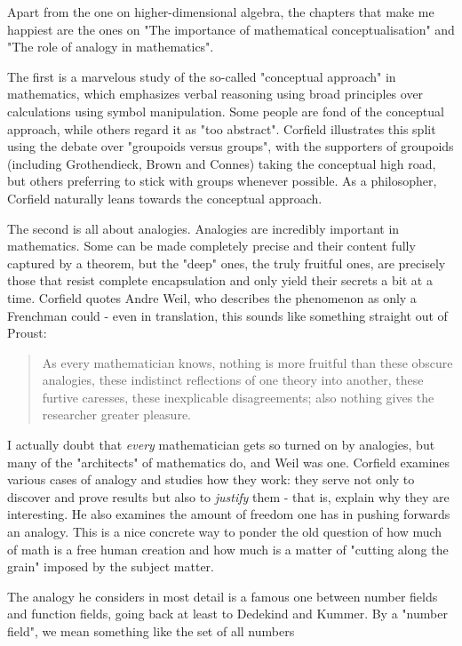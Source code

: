 Apart from the one on higher-dimensional algebra, the chapters
that make me happiest are the ones on "The importance of 
mathematical conceptualisation" and "The role of analogy in
mathematics".   

The first is a marvelous study of the so-called "conceptual 
approach" in mathematics, which emphasizes verbal reasoning using 
broad principles over calculations using symbol manipulation.
Some people are fond of the conceptual approach, while others 
regard it as "too abstract".  Corfield illustrates this split
using the debate over "groupoids versus groups", with the supporters 
of groupoids (including Grothendieck, Brown and Connes) taking 
the conceptual high road, but others preferring to stick with
groups whenever possible.  As a philosopher, Corfield naturally
leans towards the conceptual approach.

The second is all about analogies.  Analogies are incredibly 
important in mathematics.   Some can be made completely precise 
and their content fully captured by a theorem, but the "deep" 
ones, the truly fruitful ones, are precisely those that resist 
complete encapsulation and only yield their secrets a bit at a 
time.  Corfield quotes Andre Weil, who describes the phenomenon 
as only a Frenchman could - even in translation, this sounds like 
something straight out of Proust:

\begin{quote}
     As every mathematician knows, nothing is more fruitful
     than these obscure analogies, these indistinct reflections
     of one theory into another, these furtive caresses, these 
     inexplicable disagreements; also nothing gives the researcher 
     greater pleasure.
\end{quote}
I actually doubt that \emph{every} mathematician gets so turned on by 
analogies, but many of the "architects" of mathematics do, and 
Weil was one.  Corfield examines various cases of analogy and 
studies how they work: they serve not only to discover and 
prove results but also to \emph{justify} them - that is, explain why 
they are interesting.  He also examines the amount of freedom 
one has in pushing forwards an analogy.  This is a nice concrete
way to ponder the old question of how much of math is a free
human creation and how much is a matter of "cutting along the 
grain" imposed by the subject matter.  

The analogy he considers in most detail is a famous one between 
number fields and function fields, going back at least to Dedekind 
and Kummer.  By a "number field", we mean something like the set 
of all numbers 


